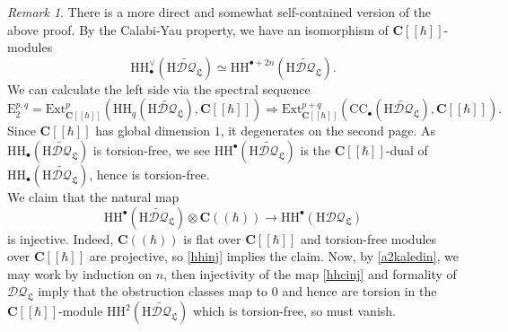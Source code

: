 \documentclass{article}
\theoremstyle{plain}
\theoremstyle{definition}
\theoremstyle{remark}
\newtheorem{remark}[theorem]{Remark}
\newcommand{\mr}{\mathrm}
\newcommand{\C}{\mathbf C}
\newcommand{\brak}{[\![\hbar]\!]}
\newcommand{\cbrak}{(\!(\hbar)\!)}
\newcommand{\3}{\vspace{3mm}}
\newcommand{\2}{\vspace{2mm}}
\newcommand{\1}{\vspace{1mm}}
\begin{document}
\begin{remark}
There is a more direct and somewhat self-contained version of the above proof. By the Calabi-Yau property, we have an isomorphism of $\C\brak$-modules $$\mr{HH}_\bullet^\vee\left(\mr{H}\widetilde{\mathcal{DQ}}_\mathfrak{L}\right)\simeq\mr{HH}^{\bullet+2n}\left(\mr{H}\widetilde{\mathcal{DQ}}_\mathfrak{L}\right).$$ We can calculate the left side via the spectral sequence $$\mr{E}_2^{p,q}=\mr{Ext}_{\C\brak}^p\left(\mr{HH}_q\left(\mr{H}\widetilde{\mathcal{DQ}}_\mathfrak{L}\right),\C\brak\right)\Rightarrow \mr{Ext}^{p+q}_{\C\brak}\left(\mr{CC}_\bullet\left(\mr{H}\widetilde{\mathcal{DQ}}_\mathfrak{L}\right),\C\brak\right).$$ Since $\C\brak$ has global dimension $1$, it degenerates on the second page. As $\mr{HH}_\bullet\left(\mr{H}\widetilde{\mathcal{DQ}}_\mathfrak{L}\right)$ is torsion-free, we see $\mr{HH}^\bullet\left(\mr{H}\widetilde{\mathcal{DQ}}_\mathfrak{L}\right)$ is the $\C\brak$-dual of $\mr{HH}_\bullet\left(\mr{H}\widetilde{\mathcal{DQ}}_\mathfrak{L}\right)$, hence is torsion-free.\\
We claim that the natural map 
\begin{equation}\label{hhcinj}\mr{HH}^\bullet\left(\mr{H}\widetilde{\mathcal{DQ}}_\mathfrak{L}\right)\otimes \C\cbrak \to \mr{HH}^\bullet(\mr{H}\mathcal{DQ}_\mathfrak{L})
\end{equation}is injective. Indeed, $\C\cbrak$ is flat over $\C\brak$ and torsion-free modules over $\C\brak$ are projective, so \cref{hhinj} implies the claim. Now, by \cref{a2kaledin}, we may work by induction on $n$, then injectivity of the map \eqref{hhcinj} and formality of $\mathcal{DQ}_\mathfrak{L}$ imply that the obstruction classes map to $0$ and hence are torsion in the $\C\brak$-module $\mr{HH}^2\left(\mr{H}\widetilde{\mathcal{DQ}}_\mathfrak{L}\right)$ which is torsion-free, so must vanish.
\end{remark}


%	
 
 
\end{document}
